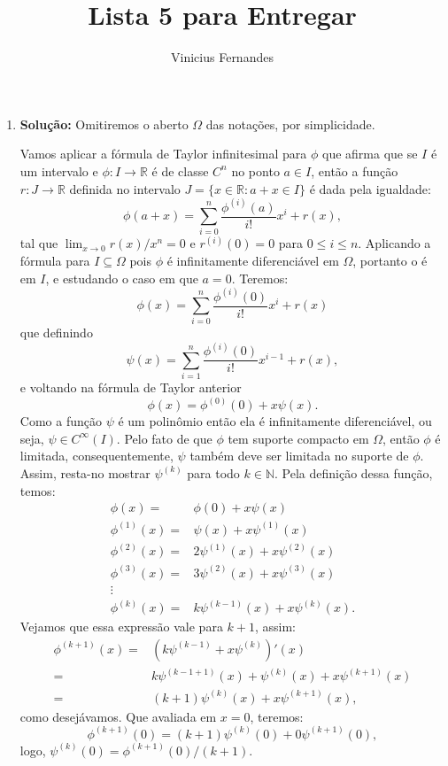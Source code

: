 \documentclass{article}
\begin{document}
	
	\title{Lista 5 para Entregar}
	\author{Vinicius Fernandes}
	
	\maketitle
	
	\begin{enumerate}
		
		\item \textbf{Solução:} Omitiremos o aberto $\Omega$ das notações, por simplicidade.
		
		Vamos aplicar a fórmula de Taylor infinitesimal para $\phi$ que afirma que se $I$ é um intervalo e $\phi : I \to \mathbb{R}$ é de classe $C^{n}$ no ponto $a \in I$, então a função $r:J \to \mathbb{R}$ definida no intervalo $J=\{x \in \mathbb{R}: a+x \in I\}$ é dada pela igualdade:
		$$
		\phi(a+x) = \sum_{i=0}^{n}\frac{\phi^{(i)}(a)}{i!}x^{i} + r(x),
		$$
		tal que $\lim_{x \to 0} r(x)/x^{n} = 0$ e $r^{(i)}(0) = 0$ para $0 \leq i \leq n$.
		Aplicando a fórmula para $I \subseteq \Omega$ pois $\phi$ é infinitamente diferenciável em $\Omega$, portanto o é em $I$, e estudando o caso em que $a=0$. Teremos: 
		$$
		\phi(x) = \sum_{i=0}^{n}\frac{\phi^{(i)}(0)}{i!}x^{i} + r(x)
		$$
		que definindo
		$$
		\psi(x) = \sum_{i=1}^{n}\frac{\phi^{(i)}(0)}{i!}x^{i-1} + r(x),
		$$
		e voltando na fórmula de Taylor anterior	
		$$
		\phi(x) = \phi^{(0)}(0) + x \psi(x).
		$$
		Como a função $\psi$ é um polinômio então ela é infinitamente diferenciável, ou seja, $\psi \in C^{\infty}(I)$. Pelo fato de que $\phi$ tem suporte compacto em $\Omega$, então $\phi$ é limitada, consequentemente, $\psi$ também deve ser limitada no suporte de $\phi$. Assim, resta-no mostrar $\psi^{(k)}$ para todo $k \in \mathbb{N}$. Pela definição dessa função, temos:
		$$
		\begin{aligned}
		\phi(x) = &\phi(0) + x \psi(x) \\
		\phi^{(1)}(x) =  &\psi(x) + x\psi^{(1)}(x) \\
		\phi^{(2)}(x) =  & 2\psi^{(1)}(x) + x\psi^{(2)}(x) \\
		\phi^{(3)}(x) =  & 3\psi^{(2)}(x) + x\psi^{(3)}(x) \\
		\vdots & \\
		\phi^{(k)}(x) =  & k\psi^{(k-1)}(x) + x\psi^{(k)}(x).
		\end{aligned}
		$$
		Vejamos que essa expressão vale para $k+1$, assim:
		$$
		\begin{aligned}
		\phi^{(k+1)}(x) =  & (k\psi^{(k-1)} + x\psi^{(k)})'(x) \\
		= & k\psi^{(k-1 + 1)}(x) + \psi^{(k)}(x) + x\psi^{(k+1)}(x) \\
		= & (k+1)\psi^{(k)}(x) + x\psi^{(k+1)}(x),
		\end{aligned}
		$$
		como desejávamos. Que avaliada em $x=0$, teremos:
		$$
		\phi^{(k+1)}(0) = (k+1)\psi^{(k)}(0) + 0\psi^{(k+1)}(0),
		$$
		logo, $\psi^{(k)}(0) = \phi^{(k+1)}(0)/(k+1)$.
		

\end{enumerate}
\end{document}
